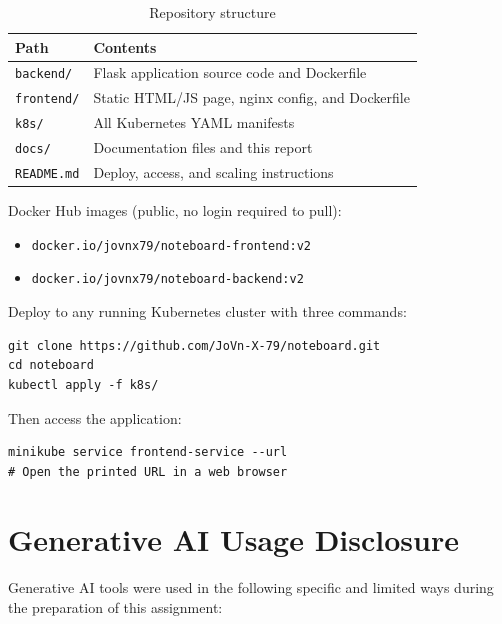 \documentclass[12pt,a4paper]{article}
\begin{document}
\begin{table}[h]
\centering
\begin{tabular}{@{}ll@{}}
\toprule
\textbf{Path} & \textbf{Contents} \\
\midrule
\texttt{backend/}   & Flask application source code and Dockerfile \\
\texttt{frontend/}  & Static HTML/JS page, nginx config, and Dockerfile \\
\texttt{k8s/}       & All Kubernetes YAML manifests \\
\texttt{docs/}      & Documentation files and this report \\
\texttt{README.md}  & Deploy, access, and scaling instructions \\
\bottomrule
\end{tabular}
\caption{Repository structure}
\end{table}

Docker Hub images (public, no login required to pull):

\begin{itemize}
    \item \texttt{docker.io/jovnx79/noteboard-frontend:v2}
    \item \texttt{docker.io/jovnx79/noteboard-backend:v2}
\end{itemize}

Deploy to any running Kubernetes cluster with three commands:

\begin{lstlisting}[style=yaml, caption={Full deployment from a clean cluster}]
git clone https://github.com/JoVn-X-79/noteboard.git
cd noteboard
kubectl apply -f k8s/
\end{lstlisting}

Then access the application:

\begin{lstlisting}[style=yaml, caption={Accessing the application on minikube}]
minikube service frontend-service --url
# Open the printed URL in a web browser
\end{lstlisting}

\section{Generative AI Usage Disclosure}
\label{sec:genai}

Generative AI tools were used in the following specific and limited ways during the preparation of this assignment:
\end{document}

